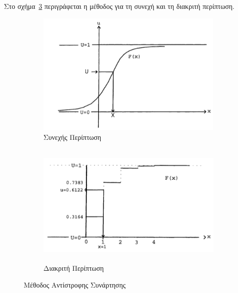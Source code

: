 \documentclass[12pt]{report}
\begin{document}
Στο σχήμα~\ref{fig:Inv_fun} περιγράφεται η μέθοδος για τη συνεχή και τη διακριτή περίπτωση.
\begin{figure}[h]
\begin{subfigure}{0.5\textwidth}
\includegraphics[width=1.0\linewidth, height=6cm]{inv_method_con} 
\caption{Συνεχής Περίπτωση}
\label{fig:inv_method_con}
\end{subfigure}
\begin{subfigure}{0.5\textwidth}
\includegraphics[width=1.0\linewidth, height=6cm]{inv_method_dis}
\caption{Διακριτή Περίπτωση}
\label{fig:inv_method_dis}
\end{subfigure}
 
\caption{Μέθοδος Αντίστροφης Συνάρτησης}
\label{fig:Inv_fun}
\end{figure}
\end{document}

